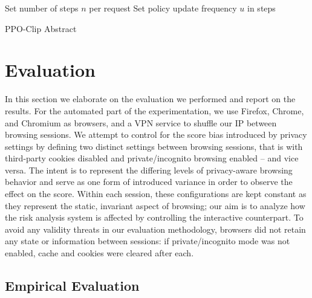 \begin{algorithm}
\SetAlgoLined
 Set number of steps $n$ per request\;
 Set policy update frequency $u$ in steps\;
 \caption{PPO-Clip Abstract}
 \label{alg:abstract}
\end{algorithm}

\section{Evaluation}
\label{sec:evaluationrere}

In this section we elaborate on the evaluation we performed and report on the results.
For the automated part of the experimentation, we use Firefox, Chrome, and Chromium as browsers, and a VPN service to shuffle our IP between browsing sessions.
We attempt to control for the score bias introduced by privacy settings by defining two distinct settings between browsing sessions, that is with third-party cookies disabled and private/incognito browsing enabled -- and vice versa.
The intent is to represent the differing levels of privacy-aware browsing behavior and serve as one form of introduced variance in order to observe the effect on the score.
Within each session, these configurations are kept constant as they represent the static, invariant aspect of browsing; our aim is to analyze how the risk analysis system is affected by controlling the interactive counterpart.
To avoid any validity threats in our evaluation methodology, browsers did not retain any state or information between sessions: if private/incognito mode was not enabled, cache and cookies were cleared after each.

\subsection{Empirical Evaluation}
\label{sub:empirical}

